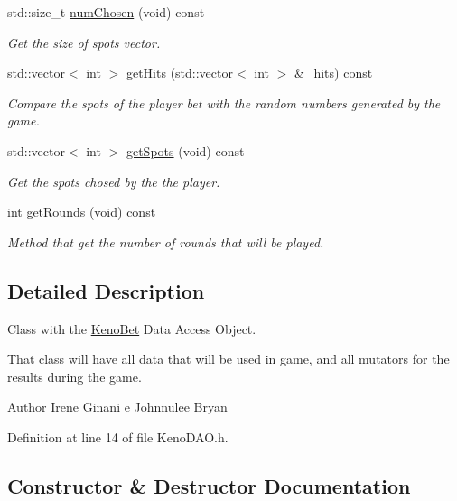 \begin{DoxyCompactItemize}
std\+::size\+\_\+t \hyperlink{class_keno_bet_a65f3e4d2710ab66a410a0432b5988c24}{num\+Chosen} (void) const 
\begin{DoxyCompactList}\small\item\em Get the size of spots vector. \end{DoxyCompactList}\item 
std\+::vector$<$ int $>$ \hyperlink{class_keno_bet_a536eff08ad4d479872bf9ffcfe6728dc}{get\+Hits} (std\+::vector$<$ int $>$ \&\+\_\+hits) const 
\begin{DoxyCompactList}\small\item\em Compare the spots of the player bet with the random numbers generated by the game. \end{DoxyCompactList}\item 
std\+::vector$<$ int $>$ \hyperlink{class_keno_bet_a219a00440238516ab80f4471dd84f812}{get\+Spots} (void) const 
\begin{DoxyCompactList}\small\item\em Get the spots chosed by the the player. \end{DoxyCompactList}\item 
int \hyperlink{class_keno_bet_adaa1b0402eac5f526c4bba76decb6385}{get\+Rounds} (void) const 
\begin{DoxyCompactList}\small\item\em Method that get the number of rounds that will be played. \end{DoxyCompactList}\end{DoxyCompactItemize}


\subsection{Detailed Description}
Class with the \hyperlink{class_keno_bet}{Keno\+Bet} Data Access Object. 

That class will have all data that will be used in game, and all mutators for the results during the game. \begin{DoxyAuthor}{Author}
Irene Ginani e Johnnulee Bryan 
\end{DoxyAuthor}


Definition at line 14 of file Keno\+D\+A\+O.\+h.



\subsection{Constructor \& Destructor Documentation}
